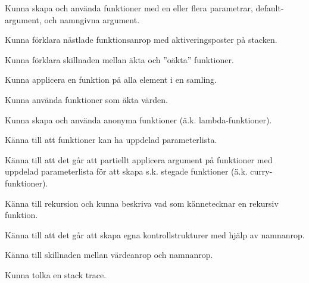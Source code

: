 
\item Kunna skapa och använda funktioner med en eller flera parametrar, default-argument, och namngivna argument.
\item Kunna förklara nästlade funktionsanrop med aktiveringsposter på stacken.
\item Kunna förklara skillnaden mellan äkta och ''oäkta'' funktioner.
\item Kunna applicera en funktion på alla element i en samling.

\item Kunna använda funktioner som äkta värden.
\item Kunna skapa och använda anonyma funktioner (ä.k. lambda-funktioner).

\item Känna till att funktioner kan ha uppdelad parameterlista.
\item Känna till att det går att partiellt applicera argument på funktioner med uppdelad parameterlista för att skapa s.k. stegade funktioner (ä.k. curry-funktioner).

\item Känna till rekursion och kunna beskriva vad som kännetecknar en rekursiv funktion.

\item Känna till att det går att skapa egna kontrollstrukturer med hjälp av namnanrop.
\item Känna till skillnaden mellan värdeanrop och namnanrop.
\item Kunna tolka en stack trace.

